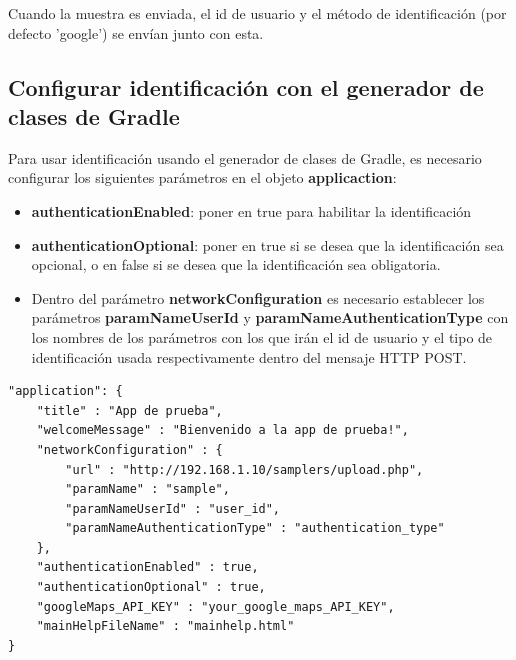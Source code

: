 Cuando la muestra es enviada, el id de usuario y el método de identificación (por defecto 'google') se envían junto con esta.


\subsection{Configurar identificación con el generador de clases de Gradle} \label{sec:identificacion_gradle}

Para usar identificación usando el generador de clases de Gradle, es necesario configurar los siguientes parámetros en el objeto \textbf{applicaction}:

\begin{itemize}

	\item \textbf{authenticationEnabled}: poner en true para habilitar la identificación
		
	\item \textbf{authenticationOptional}: poner en true si se desea que la identificación sea opcional, o en false si se desea que la identificación sea obligatoria.
	
	\item Dentro del parámetro \textbf{networkConfiguration} es necesario establecer los parámetros \textbf{paramNameUserId} y \textbf{paramNameAuthenticationType} con los nombres de los parámetros con los que irán el id de usuario y el tipo de identificación usada respectivamente dentro del mensaje HTTP POST.
	

\end{itemize}

\begin{lstlisting}[language=XML, frame=tlbr, caption=Ejemplo del objeto application configurado para usar identificación (líneas 7\, 8\, 10 y 11).]
"application": {
	"title" : "App de prueba",
	"welcomeMessage" : "Bienvenido a la app de prueba!",
	"networkConfiguration" : {
		"url" : "http://192.168.1.10/samplers/upload.php",
		"paramName" : "sample",
		"paramNameUserId" : "user_id",
		"paramNameAuthenticationType" : "authentication_type"
	},
	"authenticationEnabled" : true,
	"authenticationOptional" : true,
	"googleMaps_API_KEY" : "your_google_maps_API_KEY",
	"mainHelpFileName" : "mainhelp.html"
}
\end{lstlisting}


